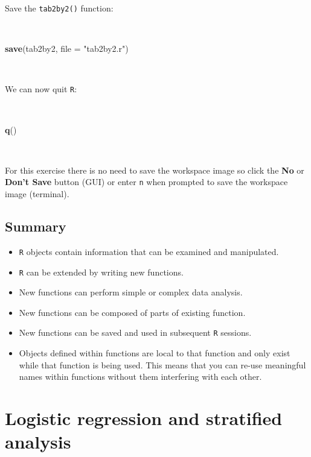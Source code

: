 \documentclass[12pt,a4paper]{book}
\newenvironment{Shaded}{\begin{snugshade}}{\end{snugshade}}
\newcommand{\KeywordTok}[1]{\textcolor[rgb]{0.13,0.29,0.53}{\textbf{#1}}}
\newcommand{\DataTypeTok}[1]{\textcolor[rgb]{0.13,0.29,0.53}{#1}}
\newcommand{\StringTok}[1]{\textcolor[rgb]{0.31,0.60,0.02}{#1}}
\newcommand{\NormalTok}[1]{#1}
\theoremstyle{definition}
\theoremstyle{definition}
\theoremstyle{definition}
\theoremstyle{remark}
\begin{document}
Save the \texttt{tab2by2()} function:

~

\begin{Shaded}
\begin{Highlighting}[]
\KeywordTok{save}\NormalTok{(tab2by2, }\DataTypeTok{file =} \StringTok{"tab2by2.r"}\NormalTok{)}
\end{Highlighting}
\end{Shaded}

~

We can now quit \texttt{R}:

~

\begin{Shaded}
\begin{Highlighting}[]
\KeywordTok{q}\NormalTok{()}
\end{Highlighting}
\end{Shaded}

~

For this exercise there is no need to save the workspace image so click
the \textbf{No} or \textbf{Don't Save} button (GUI) or enter \texttt{n}
when prompted to save the workspace image (terminal).

\hypertarget{summary-1}{%
\section{Summary}\label{summary-1}}

\begin{itemize}
\item
  \texttt{R} objects contain information that can be examined and
  manipulated.
\item
  \texttt{R} can be extended by writing new functions.
\item
  New functions can perform simple or complex data analysis.
\item
  New functions can be composed of parts of existing function.
\item
  New functions can be saved and used in subsequent \texttt{R} sessions.
\item
  Objects defined within functions are local to that function and only
  exist while that function is being used. This means that you can
  re-use meaningful names within functions without them interfering with
  each other.
\end{itemize}

\hypertarget{exercise3}{%
\chapter{Logistic regression and stratified analysis}\label{exercise3}}
\end{document}
